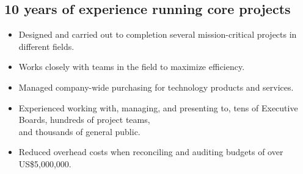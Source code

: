 \documentclass[]{deedy-resume-openfont}
\begin{document}
\subsection{10 years of experience running core projects}
\vspace{\topsep}
    \begin{itemize} 
    	\item Designed and carried out to completion several mission-critical projects in different fields.
        \item Works closely with teams in the field to maximize efficiency.
        \item Managed company-wide purchasing for technology products and services.
        \item Experienced working with, managing, and presenting to, tens of Executive Boards, hundreds of project teams, \\ and thousands of general public.
		\item Reduced overhead costs when reconciling and auditing budgets of over US\$5,000,000.
	\end{itemize}
\end{document}
